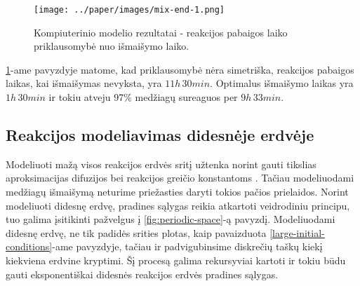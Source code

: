 \begin{figure}[h!]
    \centering
    \texttt{[image: ../paper/images/mix-end-1.png]}

    \caption{Kompiuterinio modelio rezultatai - reakcijos pabaigos laiko priklausomybė nuo išmaišymo laiko. }

    \label{mix-end}
\end{figure}

\ref{mix-end}-ame pavyzdyje matome, kad priklausomybė nėra simetriška, reakcijos pabaigos laikas, kai išmaišymas nevyksta, yra $11h\, 30min$. Optimalus išmaišymo laikas yra $1h\, 30min$ ir tokiu atveju 97\% medžiagų sureaguos per $9h\,33min$.

\subsection{Reakcijos modeliavimas didesnėje erdvėje}

Modeliuoti mažą visos reakcijos erdvės sritį užtenka norint gauti tikslias aproksimacijas difuzijos bei reakcijos greičio konstantoms \cite{mackeviciusCloserLookComputer2012}. Tačiau modeliuodami medžiagų išmaišymą neturime priežasties daryti tokios pačios prielaidos. Norint modeliuoti didesnę erdvę, pradines sąlygas reikia atkartoti veidrodiniu principu, tuo galima įsitikinti pažvelgus į \ref{fig:periodic-space}-ą pavyzdį. Modeliuodami didesnę erdvę, ne tik padidės srities plotas, kaip pavaizduota \ref{large-initial-conditions}-ame pavyzdyje, tačiau ir padvigubinsime diskrečių taškų kiekį kiekviena erdvine kryptimi. Šį procesą galima rekursyviai kartoti ir tokiu būdu gauti eksponentiškai didesnės reakcijos erdvės pradines sąlygas.


